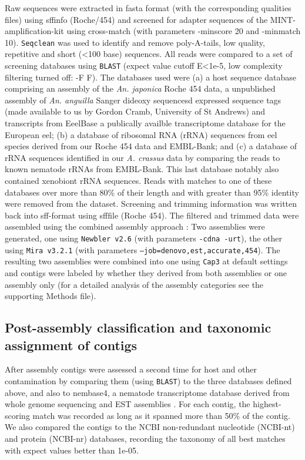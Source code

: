 \documentclass[10pt]{bmc_article}
\newenvironment{bmcformat}{\begin{raggedright}\baselineskip20pt\sloppy\setboolean{publ}{false}}{\end{raggedright}\baselineskip20pt\sloppy}
\begin{document}
\begin{bmcformat}
Raw sequences were extracted in fasta format (with the corresponding
qualities files) using sffinfo (Roche/454) and screened for adapter
sequences of the MINT-amplification-kit using cross-match \cite{PHRAP}
(with parameters -minscore 20 and -minmatch 10). \texttt{Seqclean}
\cite{tgicl_pertea} was used to identify and remove poly-A-tails, low
quality, repetitive and short (<100 base) sequences. All reads were
compared to a set of screening databases using \texttt{BLAST} (expect
value cutoff E<1e-5, low complexity filtering turned off: -F F). The
databases used were (a) a host sequence database comprising an
assembly of the \textit{An. japonica} Roche 454 data, a unpublished
assembly of \textit{An. anguilla} Sanger dideoxy sequencesd expressed
sequence tags (made available to us by Gordon Cramb, University of St
Andrews) and transcripts from EeelBase \cite{pmid21080939} a
publically availble transcriptome database for the European eel; (b) a
database of ribosomal RNA (rRNA) sequences from eel species derived
from our Roche 454 data and EMBL-Bank; and (c) a database of rRNA
sequences identified in our \textit{A. crassus} data by comparing the
reads to known nematode rRNAs from EMBL-Bank. This last database
notably also contained xenobiont rRNA sequences. Reads with matches to
one of these databases over more than 80\% of their length and with
greater than 95\% identity were removed from the dataset. Screening
and trimming information was written back into sff-format using
sfffile (Roche 454). The filtered and trimmed data were assembled
using the combined assembly approach \cite{pmid20950480}: Two
assemblies were generated, one using \texttt{Newbler v2.6}
\cite{pmid16056220} (with parameters \texttt{-cdna -urt}), the other
using \texttt{Mira v3.2.1} \cite{miraEST} (with parameters
\texttt{--job=denovo,est,accurate,454}). The resulting two assemblies
were combined into one using \texttt{Cap3} \cite{Cap3_Huang} at default
settings and contigs were labeled by whether they derived from both
assemblies or one assembly only (for a detailed analysis of the
assembly categories see the supporting Methods file).

\subsection*{Post-assembly classification and taxonomic assignment of
  contigs}

After assembly contigs were assessed a second time for host and other
contamination by comparing them (using \texttt{BLAST}) to the three
databases defined above, and also to nembase4, a nematode
transcriptome database derived from whole genome sequencing and EST
assemblies \cite{parkinson_nembase:resource_2004, pmid21550347}. For
each contig, the highest-scoring match was recorded as long as it
spanned more than 50\% of the contig. We also compared the contigs to
the NCBI non-redundant nucleotide (NCBI-nt) and protein (NCBI-nr)
databases, recording the taxonomy of all best matches with expect
values better than 1e-05.


\end{bmcformat}
\end{document}
